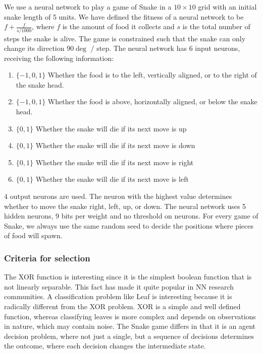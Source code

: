 We use a neural network to play a game of Snake in a $10\times10$ grid with an initial snake length of 5 units.
We have defined the fitness of a neural network to be $f + \frac{f}{s/1000}$,
where $f$ is the amount of food it collects and $s$ is the total number of steps the snake is alive.
The game is constrained such that the snake can only change its direction $90\deg$ / step.
The neural network has 6 input neurons, receiving the following information:
\begin{enumerate}
\item $\{-1, 0, 1\}$ Whether the food is to the left, vertically aligned, or to the right of the snake head.
\item $\{-1, 0, 1\}$ Whether the food is above, horizontally aligned, or below the snake head.
\item $\{0, 1\}$ Whether the snake will die if its next move is up
\item $\{0, 1\}$ Whether the snake will die if its next move is down
\item $\{0, 1\}$ Whether the snake will die if its next move is right
\item $\{0, 1\}$ Whether the snake will die if its next move is left
\end{enumerate}
4 output neurons are used. The neuron with the highest value determines whether to move the snake right, left, up, or down.
The neural network uses 5 hidden neurons, 9 bits per weight and no threshold on neurons.
For every game of Snake, we always use the same random seed to decide the positions where pieces of food will spawn.

\subsubsection{Criteria for selection}
The XOR function is interesting since it is the simplest boolean function that is not linearly separable.
This fact has made it quite popular in NN research communities\cite{masterThesisGANN}.
A classification problem like Leaf is interesting because it is radically different from the XOR problem.
XOR is a simple and well defined function, whereas classifying leaves is more complex and depends on observations in nature, which may contain noise.
The Snake game differs in that it is an agent decision problem, where not just a single, but a sequence of decisions determines the outcome, where each decision changes the intermediate state.